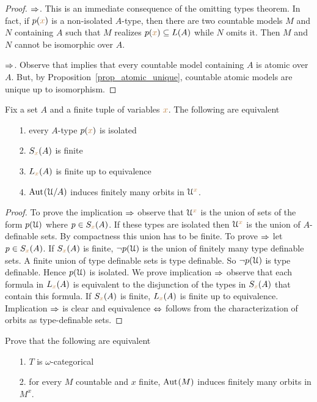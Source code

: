 \vspace*{-\parskip}
\begin{proof} $\Rightarrow$. This is an immediate consequence of the omitting types theorem.
In fact, if $p({\color{brown} x})$ is a non-isolated $A$-type, then there are two countable models $M$ and $N$ containing $A$ such that $M$ realizes $p({\color{brown} x})\subseteq L(A)$ while $N$ omits it.
Then $M$ and $N$ cannot be isomorphic over $A$.

$\Rightarrow$. Observe that  implies that every countable model containing $A$ is atomic over $A$.
But, by Proposition~\ref{prop_atomic_unique}, countable atomic models are unique up to isomorphism.
\end{proof}

\begin{proposition}\label{prop_ERNS_equivalents}
Fix a set $A$ and a finite tuple of variables ${\color{brown} x}$.
The following are equivalent\nobreak
\begin{itemize}   
\item[1.] every $A$-type $p({\color{brown} x})$ is isolated
\item[2.] $S_{\color{brown} x}(A)$ is finite
\item[3.] $L_{\color{brown} x}(A)$ is finite up to equivalence
\item[4.] ${\rm Aut\kern.15ex}(\EuScript U/A)$ induces finitely many orbits in $\EuScript U^{\color{brown} x}$.
\end{itemize}
\end{proposition}
\begin{proof}To prove the implication $\Rightarrow$ observe that $\EuScript U^{\color{brown} x}$ is the union of sets of the form $p(\EuScript U)$ where $p\in S_{\color{brown} x}(A)$.
If these types are isolated then $\EuScript U^{\color{brown} x}$ is the union of $A$-definable sets.
By compactness this union has to be finite.
To prove $\Rightarrow$ let $p\in S_{\color{brown} x}(A)$.
If $S_{\color{brown} x}(A)$ is finite, $\neg p(\EuScript U)$ is the union of finitely many type definable sets.
A finite union of type definable sets is type definable.
So $\neg p(\EuScript U)$ is type definable.
Hence $p(\EuScript U)$ is isolated.
We prove implication $\Rightarrow$ observe that each formula in $L_{\color{brown} x}(A)$ is equivalent to the disjunction of the types in $S_{\color{brown} x}(A)$ that contain this formula.
If $S_{\color{brown} x}(A)$ is finite, $L_{\color{brown} x}(A)$ is finite up to equivalence.
Implication $\Rightarrow$ is clear and equivalence $\Leftrightarrow$ follows from the characterization of orbits as type-definable sets.
\end{proof}

\begin{exercise}\label{ex_oligomorphic}
   Prove that the following are equivalent
   \begin{itemize}   
   \item[1.] $T$ is $\omega$-categorical
   \item[2.] for every $M$ countable and $x$ finite, ${\rm Aut\kern.15ex}(M)$ induces finitely many orbits in $M^x$.
   \end{itemize}
\end{exercise}

